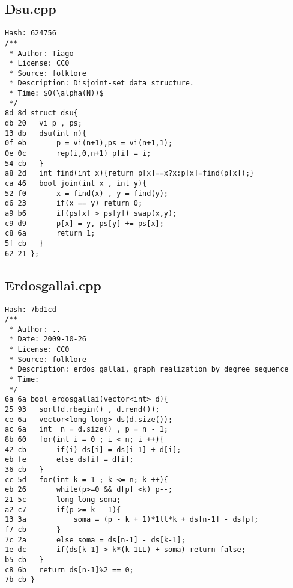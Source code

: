 \documentclass[11pt, a4paper, twoside]{article}
\begin{document}
\subsection{Dsu.cpp}
\begin{lstlisting}
Hash: 624756
/**
 * Author: Tiago
 * License: CC0
 * Source: folklore
 * Description: Disjoint-set data structure.
 * Time: $O(\alpha(N))$
 */
8d 8d struct dsu{
db 20 	vi p , ps;
13 db 	dsu(int n){
0f eb 		p = vi(n+1),ps = vi(n+1,1);
0e 0c 		rep(i,0,n+1) p[i] = i;
54 cb 	}
a8 2d 	int find(int x){return p[x]==x?x:p[x]=find(p[x]);}
ca 46 	bool join(int x , int y){
52 f0 		x = find(x) , y = find(y);
d6 23 		if(x == y) return 0;
a9 b6 		if(ps[x] > ps[y]) swap(x,y);
c9 d9 		p[x] = y, ps[y] += ps[x];
c8 6a 		return 1;
5f cb 	}
62 21 };	
\end{lstlisting}

\subsection{Erdosgallai.cpp}
\begin{lstlisting}
Hash: 7bd1cd
/**
 * Author: ..
 * Date: 2009-10-26
 * License: CC0
 * Source: folklore
 * Description: erdos gallai, graph realization by degree sequence
 * Time: 
 */
6a 6a bool erdosgallai(vector<int> d){
25 93 	sort(d.rbegin() , d.rend());
ce 6a 	vector<long long> ds(d.size());
ac 6a 	int  n = d.size() , p = n - 1;
8b 60 	for(int i = 0 ; i < n; i ++){
42 cb 		if(i) ds[i] = ds[i-1] + d[i];
eb fe 		else ds[i] = d[i];
36 cb 	}
cc 5d 	for(int k = 1 ; k <= n; k ++){
eb 26 		while(p>=0 && d[p] <k) p--;
21 5c 		long long soma;
a2 c7 		if(p >= k - 1){
13 3a 			soma = (p - k + 1)*1ll*k + ds[n-1] - ds[p];
f7 cb 		}
7c 2a 		else soma = ds[n-1] - ds[k-1];
1e dc 		if(ds[k-1] > k*(k-1LL) + soma) return false;
b5 cb 	}
c8 6b 	return ds[n-1]%2 == 0;
7b cb }
\end{lstlisting}
\end{document}
